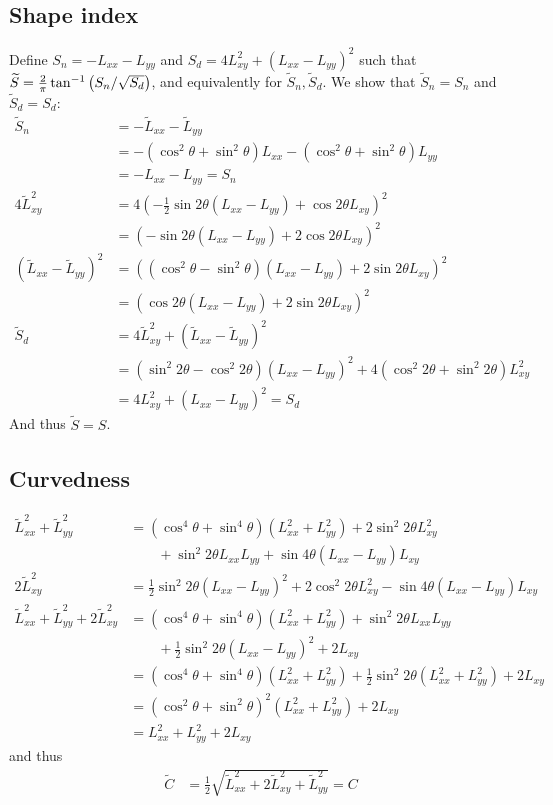 \documentclass[thesis.tex]{subfiles}
\begin{document}
\subsection{Shape index} \label{apx:rotation_si}
%
Define $S_n = -L_{xx} - L_{yy}$ and $S_d = 4 L_{xy}^2 + (L_{xx} - L_{yy})^2$ such that $\widetilde{S} = \frac{2}{\pi} \tan^{-1} \left( S_n/\sqrt{S_d} \right)$, and equivalently for $\widetilde{S}_n,\widetilde{S}_d$. We show that $\widetilde{S}_n = S_n$ and $\widetilde{S}_d = S_d$:
%
\begin{align*}
\widetilde{S}_n &= - \widetilde{L}_{xx} - \widetilde{L}_{yy} \\
&= -(\cos^2 \theta + \sin^2 \theta)  L_{xx} - (\cos^2 \theta + \sin^2 \theta) L_{yy} \\
&= -L_{xx} - L_{yy} = S_n \\
4\widetilde{L}_{xy}^2 &= 4(-\frac12 \sin 2\theta (L_{xx} - L_{yy}) + \cos 2\theta L_{xy})^2 \\
&= (- \sin 2\theta (L_{xx} - L_{yy}) + 2 \cos 2\theta L_{xy})^2 \\
(\widetilde{L}_{xx} - \widetilde{L}_{yy})^2 &= ((\cos^2 \theta - \sin^2 \theta) (L_{xx} - L_{yy}) + 2 \sin 2\theta L_{xy})^2 \\
&= (\cos 2\theta (L_{xx} - L_{yy}) + 2 \sin 2\theta L_{xy})^2 \\
\widetilde{S}_d &= 4\widetilde{L}_{xy}^2 + (\widetilde{L}_{xx} - \widetilde{L}_{yy})^2 \\
&= (\sin^2 2\theta - \cos^2 2\theta) (L_{xx} - L_{yy})^2 + 4 (\cos^2 2\theta + \sin^2 2\theta) L_{xy}^2 \\
&= 4 L_{xy}^2 + (L_{xx} - L_{yy})^2 = S_d
\end{align*}
%
And thus $\widetilde{S} = S$.
%
\subsection{Curvedness} \label{apx:rotation_c}
%
\begin{align*}
\widetilde{L}_{xx}^2 + \widetilde{L}_{yy}^2
&= (\cos^4 \theta + \sin^4 \theta) (L_{xx}^2 + L_{yy}^2) + 2 \sin^2 2\theta L_{xy}^2 \\ &\qquad + \sin^2 2\theta L_{xx} L_{yy} + \sin 4\theta (L_{xx} - L_{yy}) L_{xy} \\
2 \widetilde{L}_{xy}^2 &= \frac12 \sin^2 2\theta (L_{xx} - L_{yy})^2 + 2 \cos^2 2\theta L_{xy}^2 - \sin 4\theta (L_{xx} - L_{yy}) L_{xy} \\
\widetilde{L}_{xx}^2 + \widetilde{L}_{yy}^2 + 2 \widetilde{L}_{xy}^2
&= (\cos^4 \theta + \sin^4 \theta) (L_{xx}^2 + L_{yy}^2) + \sin^2 2\theta L_{xx} L_{yy} \\ &\qquad + \frac12 \sin^2 2\theta (L_{xx} - L_{yy})^2 + 2 L_{xy} \\
&= (\cos^4 \theta + \sin^4 \theta) (L_{xx}^2 + L_{yy}^2) + \frac12 \sin^2 2\theta (L_{xx}^2 + L_{yy}^2) + 2 L_{xy} \\
&= (\cos^2 \theta + \sin^2 \theta)^2 (L_{xx}^2 + L_{yy}^2) + 2 L_{xy} \\
&= L_{xx}^2 + L_{yy}^2 + 2 L_{xy}
\end{align*}
%
and thus
%
\begin{align*}
\widetilde{C} &= \frac12 \sqrt{\widetilde{L}_{xx}^2 + 2 \widetilde{L}_{xy}^2 + \widetilde{L}_{yy}^2} = C
\end{align*}
%
\end{document}
